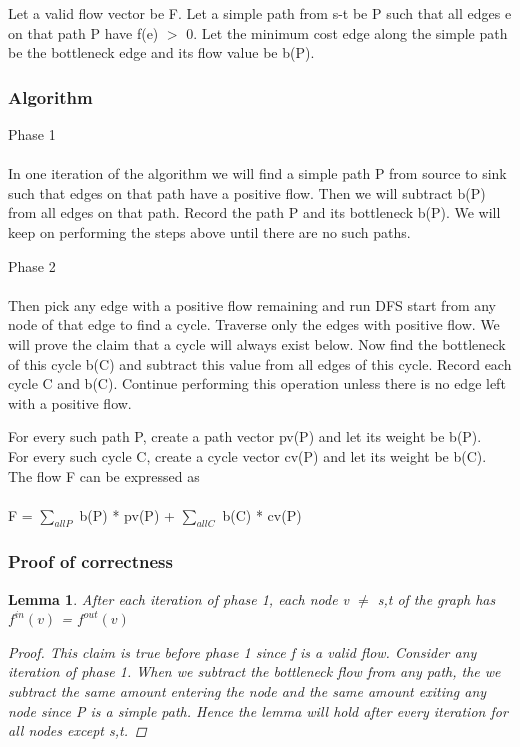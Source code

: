 \documentclass[12pt]{article}
\newtheorem{lemma}[theorem]{Lemma}
\begin{document}
Let a valid flow vector be F.  Let a simple path from s-t be P such that all edges e on that path P have f(e) $>$ 0. Let the minimum cost edge along the simple path be the bottleneck edge and its flow value be b(P).

\subsubsection{Algorithm}

Phase 1\\\\
In one iteration of the algorithm we will find a simple path P from source to sink such that edges on that path have a positive flow. Then we will subtract b(P) from all edges on that path. Record the path P and its bottleneck b(P). We will keep on performing the steps above until there are no such paths.

Phase 2\\\\
Then pick any edge with a positive flow remaining and run DFS start from any node of that edge to find a cycle. Traverse only the edges with positive flow. We will prove the claim that a cycle will always exist below. Now find the bottleneck of this cycle b(C) and subtract this value from all edges of this cycle. Record each cycle C and b(C). Continue performing this operation unless there is no edge left with a positive flow.

For every such path P, create a path vector pv(P) and let its weight be b(P).\\
For every such cycle C, create a cycle vector cv(P) and let its weight be b(C).\\

The flow F can be expressed as \\\\
F = $\sum_{all P}$ b(P) * pv(P) + $\sum_{all C}$ b(C) * cv(P) 


\subsubsection{Proof of correctness}
\begin{lemma} After each iteration of phase 1, each node v $\neq$ s,t of the graph has $f^{in}(v)$ = $f^{out}(v)$
\begin{proof}
This claim is true before phase 1 since f is a valid flow. Consider any iteration of phase 1. When we subtract the bottleneck flow from any path, the we subtract the same amount entering the node and the same amount exiting any node since P is a simple path. Hence the lemma will hold after every iteration for all nodes except s,t.
\end{proof}
\end{lemma}
\end{document}
